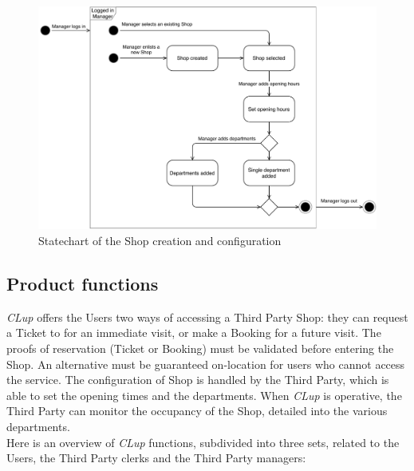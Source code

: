 \begin{figure}[H]
    \includegraphics[width=\linewidth]{Images/state-diag_Manager.pdf}
    \caption{Statechart of the Shop creation and configuration}
    \label{fig:statechart_manager}
\end{figure}



\subsection{Product functions}
\emph{CLup} offers the Users two ways of accessing a Third Party Shop: they can request a Ticket to for an immediate visit, or make a Booking for a future visit. The proofs of reservation (Ticket or Booking) must be validated before entering the Shop. An alternative must be guaranteed on-location for users who cannot access the service.
The configuration of Shop is handled by the Third Party, which is able to set the opening times and the departments. When \emph{CLup} is operative, the Third Party can monitor the occupancy of the Shop, detailed into the various departments.
\\Here is an overview of \emph{CLup} functions, subdivided into three sets, related to the Users, the Third Party clerks and the Third Party managers:

